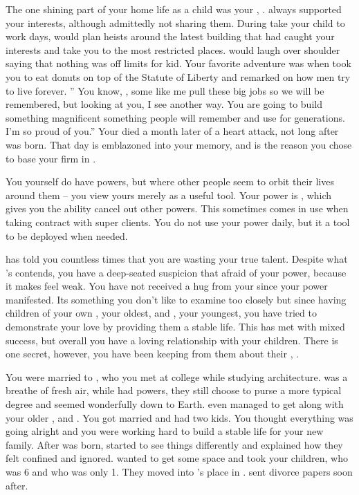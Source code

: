\documentclass[char]{LRSguildcamp1}
\begin{document}
The one shining part of your home life as a child was your \cGS{\parent}, \cGS{}. \cGS{} always supported your interests, although admittedly not sharing them. During take your child to work days, \cGS{} would plan \cGS{\their} heists around the latest building that had caught your interests and take you to the most restricted places. \cGS{} would laugh over \cGS{\their} shoulder saying that nothing was off limits for \cGS{\their} kid. Your favorite adventure was when \cGS{\they} took you to eat donuts on top of the Statute of Liberty and remarked on how men try to live forever.  '' You know, \cArchitect{}, some \cGS{\humans} like me pull these big jobs so we will be remembered, but looking at you, I see another way. You are going to build something magnificent something people will remember and use for generations. I'm so proud of you.'' Your \cGS{\parent} died a month later of a heart attack, not long after \cYoungest{} was born. That day is emblazoned into your memory, and is the reason you chose to base your firm in \pCityArchitect{}.

You yourself do have powers, but where other people seem to orbit their lives around them -- you view yours merely as a useful tool. Your power is \cArchitect{\MYsuperpower}, which gives you the ability cancel out other powers. This sometimes comes in use when taking contract with super clients. You do not use your power daily, but it a tool to be deployed when needed.

\cGrandma{} has told you countless times that you are wasting your true talent. Despite what \cGrandma{}'s contends, you have a deep-seated suspicion that \cGrandma{\theyare} afraid of your power, because it makes \cGrandma{\them} feel weak. You have not received a hug from your \cGrandma{\parent} since your power manifested. Its something you don't like to examine too closely but since having children of your own \cTeen{}, your oldest, and \cTween{}, your youngest, you have tried to demonstrate your love by providing them a stable life. This has met with mixed success, but overall you have a loving relationship with your children.  There is one secret, however, you have been keeping from them about their \cAS{\parent}, \cAS{}.

You were married to \cAS{}, who you met at college while studying architecture. \cAS{} was a breathe of fresh air, while \cAS{\they} had powers, they still choose to purse a more typical degree and seemed wonderfully down to Earth. \cAS{} even managed to get along with your older \cOldest{\sibling}, \cOldest{} and \cOldest{\their} \cOS{\spouse} \cOS{}. You got married and had two kids. You thought everything was going alright and you were working hard to build a stable life for your new family. After \cTween{} was born, \cAS{} started to see things differently and \cAS{\they} explained how they felt confined and ignored. \cAS{\they} wanted to get some space and \cAS{} took your children, \cTeen{} who was 6 and \cTween{} who was only 1. They moved into \cOS{}'s place in \pCityO{}. \cAS{} sent divorce papers soon after.
\end{document}
